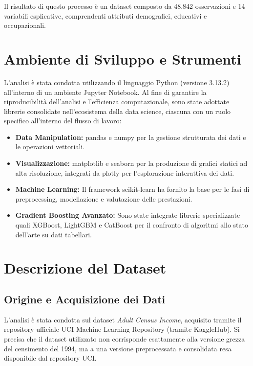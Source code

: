 \documentclass[a4paper,11pt]{article}
\begin{document}
\noindent
Il risultato di questo processo è un dataset composto da 48.842 osservazioni e 14 variabili esplicative, comprendenti attributi demografici, educativi e occupazionali.

\newpage
\section{Ambiente di Sviluppo e Strumenti}

L'analisi è stata condotta utilizzando il linguaggio Python (versione 3.13.2) all'interno di un ambiente Jupyter Notebook. Al fine di garantire la riproducibilità dell'analisi e l'efficienza computazionale, sono state adottate librerie consolidate nell'ecosistema della data science, ciascuna con un ruolo specifico all'interno del flusso di lavoro:

\begin{itemize}
    \item \textbf{Data Manipulation:} {pandas} e {numpy} per la gestione strutturata dei dati e le operazioni vettoriali.
    \item \textbf{Visualizzazione:} {matplotlib} e {seaborn} per la produzione di grafici statici ad alta risoluzione, integrati da {plotly} per l'esplorazione interattiva dei dati.
    \item \textbf{Machine Learning:} Il framework {scikit-learn} ha fornito la base per le fasi di preprocessing, modellazione e valutazione delle prestazioni.
    \item \textbf{Gradient Boosting Avanzato:} Sono state integrate librerie specializzate quali {XGBoost}, {LightGBM} e {CatBoost} per il confronto di algoritmi allo stato dell’arte su dati tabellari.
\end{itemize}

\newpage
\section{Descrizione del Dataset}

\subsection{Origine e Acquisizione dei Dati}
L'analisi è stata condotta sul dataset \textit{Adult Census Income}, acquisito tramite il repository ufficiale UCI Machine Learning Repository (tramite KaggleHub). Si precisa che il dataset utilizzato non corrisponde esattamente alla versione grezza del censimento del 1994, ma a una versione preprocessata e consolidata resa disponibile dal repository UCI.
\end{document}
